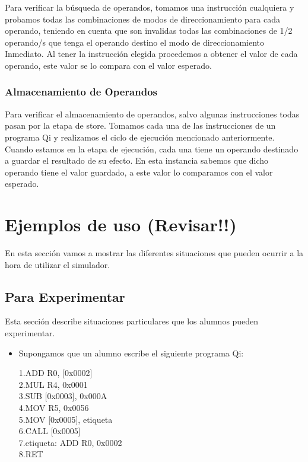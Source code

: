 \begin{enumerate}
Para verificar la búsqueda de operandos, tomamos una instrucción cualquiera y probamos todas las combinaciones de modos de direccionamiento para cada operando, teniendo en cuenta que son invalidas todas las combinaciones de 1/2 operando/s que tenga el operando destino el modo de direccionamiento Inmediato. Al tener la instrucción elegida procedemos a obtener el valor de cada operando, este valor se lo compara con el valor esperado. 
 
\subsubsection{Almacenamiento de Operandos}

Para verificar el almacenamiento de operandos, salvo algunas instrucciones todas pasan por la etapa de store.
Tomamos cada una de las instrucciones de un programa Qi y realizamos el ciclo de ejecución mencionado anteriormente.
Cuando estamos en la etapa de ejecución, cada una tiene un operando destinado a guardar el resultado de su efecto.
En esta instancia sabemos que  dicho operando tiene el valor guardado, a este valor lo comparamos con el valor esperado.

\section{Ejemplos de uso (Revisar!!)}

En esta sección vamos a mostrar las diferentes situaciones que pueden ocurrir a la hora de utilizar el simulador.

\subsection{Para Experimentar}

Esta sección describe situaciones particulares que los alumnos pueden experimentar.

\begin{itemize}

\item Supongamos que un alumno escribe el siguiente programa Qi:

1.ADD R0, [0x0002]\\
2.MUL R4, 0x0001 \\
3.SUB [0x0003], 0x000A \\
4.MOV R5, 0x0056 \\
5.MOV [0x0005], etiqueta \\
6.CALL [0x0005] \\
7.etiqueta: ADD R0, 0x0002 \\
8.RET \\


\end{itemize}
\end{enumerate}
